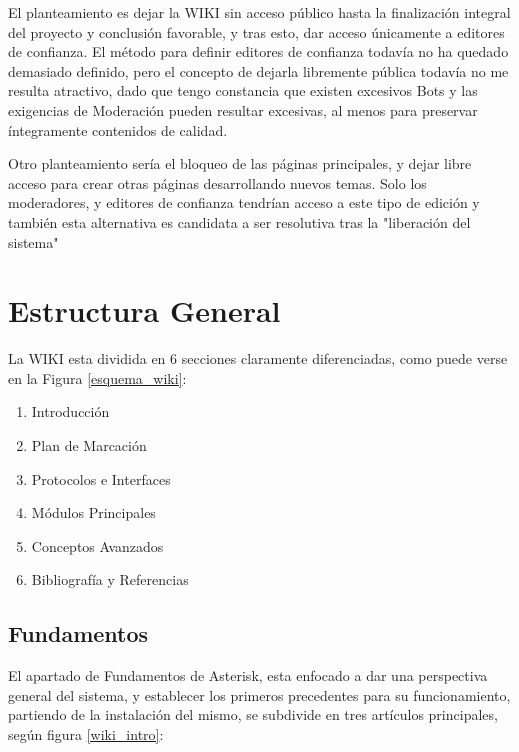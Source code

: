El planteamiento es dejar la WIKI sin acceso público hasta la finalización integral del proyecto y conclusión favorable, y tras esto, dar acceso únicamente a editores de confianza. El método para definir editores de confianza todavía no ha quedado demasiado definido, pero el concepto de dejarla libremente pública todavía no me resulta atractivo, dado que tengo constancia que existen excesivos Bots y las exigencias de Moderación pueden resultar excesivas, al menos para preservar íntegramente contenidos de calidad.

Otro planteamiento sería el bloqueo de las páginas principales, y dejar libre acceso para crear otras páginas desarrollando nuevos temas. Solo los moderadores, y editores de confianza tendrían acceso a este tipo de edición y también esta alternativa es candidata a ser resolutiva tras la "liberación del sistema"

\section{Estructura General}

La WIKI esta dividida en 6 secciones claramente diferenciadas, como puede verse en la Figura \ref{esquema_wiki}:

\begin{enumerate}
	\item Introducción
	\item Plan de Marcación
	\item Protocolos e Interfaces
	\item Módulos Principales
	\item Conceptos Avanzados
	\item Bibliografía y Referencias
\end{enumerate}


\subsection{Fundamentos}

El apartado de Fundamentos de Asterisk, esta enfocado a dar una perspectiva general del sistema, y establecer los primeros precedentes para su funcionamiento, partiendo de la instalación del mismo, se subdivide en tres artículos principales, según figura \ref{wiki_intro}:

